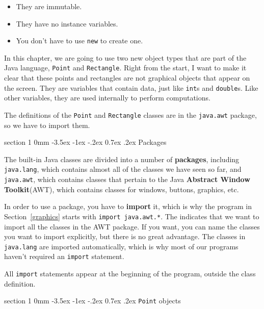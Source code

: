\documentclass{book}
\makeatletter
\renewcommand{\section}{\@startsection 
    {section} {1} {0mm}%
    {-3.5ex \@plus -1ex \@minus -.2ex}%
    {0.7ex \@plus.2ex}%
    {\normalfont\Large\bfseries}}
\makeatother
\begin{document}
\begin{itemize}

\item They are immutable.

\item They have no instance variables.

\item You don't have to use {\tt new} to create one.

\end{itemize}

In this chapter, we are going to use two new object types that are
part of the Java language, {\tt Point} and {\tt Rectangle}.
Right from the start, I want to make it clear that these points
and rectangles are not graphical objects that appear on the
screen.  They are variables that contain data, just like {\tt int}s
and {\tt double}s.  Like other variables, they are used internally
to perform computations.

The definitions of the {\tt Point} and {\tt Rectangle} classes are
in the {\tt java.awt} package, so we have to import them.

\section{Packages}

The built-in Java classes are divided into a number of {\bf
packages}, including {\tt java.lang}, which contains almost all of the
classes we have seen so far, and {\tt java.awt}, which contains
classes that pertain to the Java {\bf Abstract Window Toolkit}(AWT),
which contains classes for windows, buttons, graphics, etc.

In order to use a package, you have to {\bf import} it, which is
why the program in Section~\ref{graphics} starts with {\tt import
java.awt.*}.  The {\tt *} indicates that we want to import all
the classes in the AWT package.  If you want, you can name the classes
you want to import explicitly, but there is no great advantage.  The
classes in {\tt java.lang} are imported automatically, which is why
most of our programs haven't required an {\tt import} statement.

All {\tt import} statements appear at the beginning of the program,
outside the class definition.

\section{{\tt Point} objects}
\end{document}
